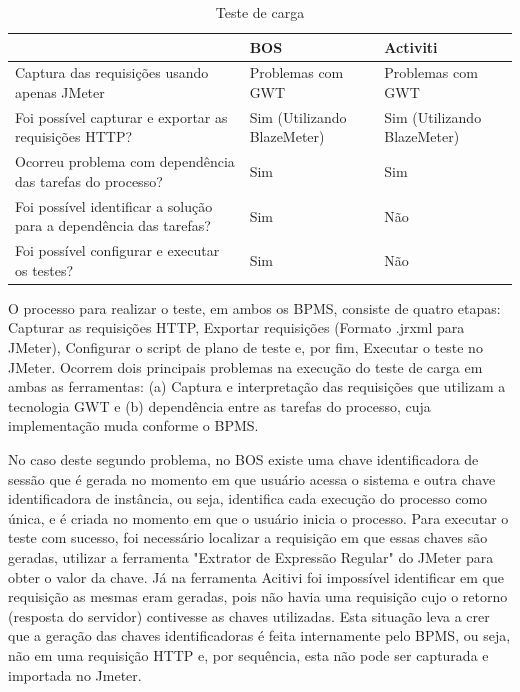 \documentclass[12pt]{article}
\begin{document}
\begin{table}
{\scriptsize
\begin{tabular}{|p{5cm}|p{4cm}|p{4cm}|}
\hline
 & BOS & Activiti \\\hline
Captura das requisições usando apenas JMeter & Problemas com GWT & Problemas com GWT\\\hline
Foi possível capturar e exportar as requisições HTTP? & Sim (Utilizando BlazeMeter) & Sim (Utilizando BlazeMeter)\\\hline
Ocorreu problema com dependência das tarefas do processo? & Sim & Sim \\\hline
Foi possível identificar a solução para a dependência das tarefas? & Sim & Não\\\hline
Foi possível configurar e executar os testes? & Sim & Não\\\hline
\end{tabular}
}
\caption{Teste de carga}
\label{tab:testeCarga}
\end{table}


O processo para realizar o teste, em ambos os BPMS, consiste de quatro etapas: Capturar as requisições HTTP, Exportar requisições (Formato .jrxml para JMeter), Configurar o script de plano de teste e, por fim, Executar o teste no JMeter. Ocorrem dois principais problemas na execução do teste de carga em ambas as ferramentas: (a) Captura e interpretação das requisições que utilizam a tecnologia GWT e (b) dependência entre as tarefas do processo, cuja implementação muda conforme o BPMS. 

No caso deste segundo problema, no BOS existe uma chave identificadora de sessão que é gerada no momento em que usuário acessa o sistema e outra chave identificadora de instância, ou seja, identifica cada execução do processo como única, e é criada no momento em que o usuário inicia o processo. Para executar o teste com sucesso, foi necessário localizar a requisição em que essas chaves são geradas, utilizar a ferramenta "Extrator de Expressão Regular" do JMeter para obter o valor da chave. Já na ferramenta Acitivi foi impossível identificar em que requisição as mesmas eram geradas, pois não havia uma requisição cujo o retorno (resposta do servidor) contivesse as chaves utilizadas. Esta situação leva a crer que a geração das chaves identificadoras é feita internamente pelo BPMS, ou seja, não em uma requisição HTTP e, por sequência, esta não pode ser capturada e importada no Jmeter.

\end{document}

